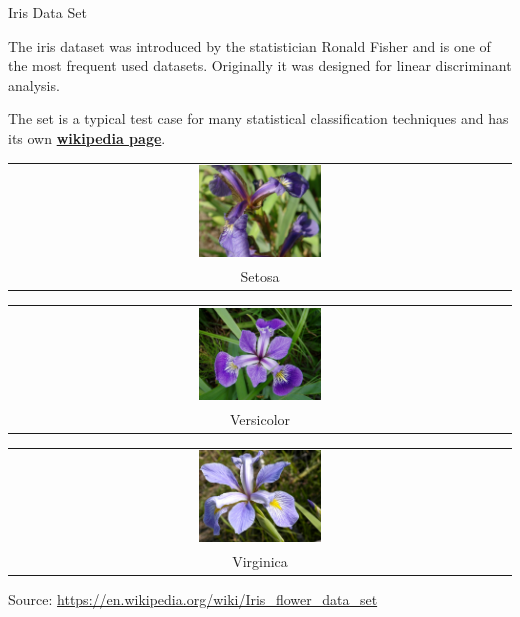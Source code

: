 \documentclass[11pt,compress,t,notes=noshow, xcolor=table]{beamer}
\begin{document}
\begin{vbframe}{Iris Data Set}



The iris dataset was introduced by the statistician Ronald Fisher and is one
of the most frequent used datasets. Originally it was designed for linear
discriminant analysis.

The set is a typical test case for many statistical classification techniques
and has its own \textbf{\href{https://en.wikipedia.org/wiki/Iris_flower_data_set}{wikipedia page}}.

\begin{center}
\parbox{0.3\textwidth}{
\centering
  \begin{tabular}{@{}c@{}}
    \includegraphics[width=0.25\textwidth]{figure_man/iris_setosa.jpg} \\[\abovecaptionskip]
    \small Setosa
  \end{tabular}
}
\parbox{0.3\textwidth}{
\centering
  \begin{tabular}{@{}c@{}}
    \includegraphics[width=0.25\textwidth]{figure_man/iris_versicolor.jpg} \\[\abovecaptionskip]
    \small Versicolor
  \end{tabular}
}
\parbox{0.3\textwidth}{
\centering
  \begin{tabular}{@{}c@{}}
    \includegraphics[width=0.25\textwidth]{figure_man/iris_virginica.jpg} \\[\abovecaptionskip]
    \small Virginica
  \end{tabular}
}
\end{center}
Source: \url{https://en.wikipedia.org/wiki/Iris_flower_data_set}


\end{vbframe}
\end{document}
